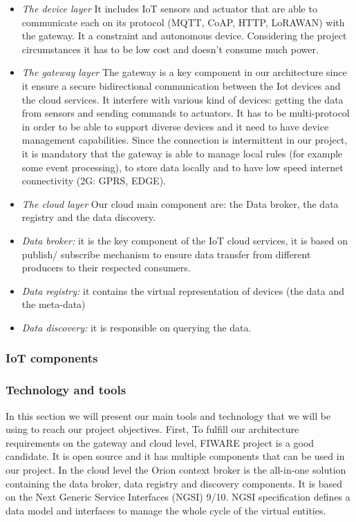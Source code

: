 \begin{itemize}
  \item \emph{The device layer}
    It includes IoT sensors and actuator that are able to communicate each on its protocol (MQTT, CoAP, HTTP, LoRAWAN) with the gateway. It a constraint and autonomous device. Considering the project circumstances it has to be low cost and doesn’t consume much power.
  \item \emph{The gateway layer}
  The gateway is a key component in our architecture since it ensure a secure bidirectional communication between the Iot devices and the cloud services. It interfere with various kind of devices: getting the data from sensors and sending commands to actuators.
  It has to be multi-protocol in order to be able to support diverse devices and it need to have device management capabilities.
Since the connection is intermittent in our project, it is mandatory that the gateway is able to manage local rules (for example some event processing), to store data locally and to have low speed internet connectivity (2G: GPRS, EDGE).
  \item \emph{The cloud layer}
  Our cloud main component are: the Data broker, the data registry and the data discovery.
  \item \emph{Data broker:}
    it is the key component of the IoT cloud services, it is based on publish/ subscribe mechanism to ensure data transfer from different producers to their respected consumers.
  \item \emph{Data registry:}
    it contains the virtual representation of devices (the data and the meta-data)
  \item \emph{Data discovery:} 
    it is responsible on querying the data.
\end{itemize}

\subsubsection{IoT components}



\subsubsection{Technology and tools}

In this section we will present our main tools and technology that we will be using to reach our project objectives.
First, To fulfill our architecture requirements on the gateway and cloud level, FIWARE project is a good candidate.
It is open source and it has multiple components that can be used in our project.
In the cloud level the Orion context broker is the all-in-one solution containing the data broker, data registry and discovery components.
It is based on the Next Generic Service Interfaces (NGSI) 9/10.
NGSI specification defines a data model and interfaces to manage the whole cycle of the virtual entities.  

